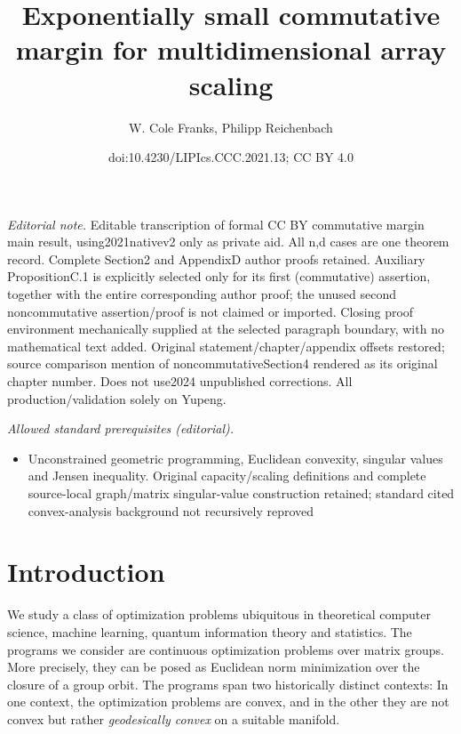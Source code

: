 \documentclass[10pt,a4paper]{article}
\title{Exponentially small commutative margin for multidimensional array scaling}
\author{W. Cole Franks, Philipp Reichenbach}
\date{doi:10.4230/LIPIcs.CCC.2021.13; CC BY 4.0}
\numberwithin{equation}{section}
\begin{document}
\maketitle
\noindent\textit{Editorial note.} Editable transcription of formal CC BY commutative margin main result, using2021nativev2 only as private aid. All n,d cases are one theorem record. Complete Section2 and AppendixD author proofs retained. Auxiliary PropositionC.1 is explicitly selected only for its first (commutative) assertion, together with the entire corresponding author proof; the unused second noncommutative assertion/proof is not claimed or imported. Closing proof environment mechanically supplied at the selected paragraph boundary, with no mathematical text added. Original statement/chapter/appendix offsets restored; source comparison mention of noncommutativeSection4 rendered as its original chapter number. Does not use2024 unpublished corrections. All production/validation solely on Yupeng.\par\medskip
\noindent\textit{Allowed standard prerequisites (editorial).}\begin{itemize}
\item Unconstrained geometric programming, Euclidean convexity, singular values and Jensen inequality. Original capacity/scaling definitions and complete source-local graph/matrix singular-value construction retained; standard cited convex-analysis background not recursively reproved
\end{itemize}\medskip
\section{Introduction}
We study a class of optimization problems ubiquitous in theoretical computer science, machine learning,  quantum information theory and statistics. The programs we consider are continuous optimization problems over matrix groups. More precisely, they can be posed as Euclidean norm minimization over the closure of a group orbit. The programs span two historically distinct contexts: In one context, the optimization problems are convex, and in the other they are not convex but rather \emph{geodesically convex} on a suitable manifold.
\end{document}
